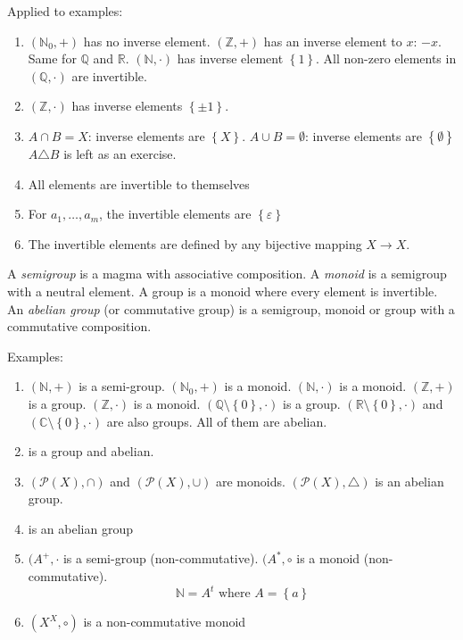 \documentclass[a4paper,landscape,twocolumn]{article}
\newcommand\set[1]{\left\{#1\right\}}
\begin{document}
Applied to examples:
\begin{enumerate}
  \item
    $(\mathbb{N}_0, +)$ has no inverse element.
    $(\mathbb{Z}, +)$ has an inverse element to $x$: $-x$.
    Same for $\mathbb{Q}$ and $\mathbb{R}$.
    $(\mathbb{N}, \cdot)$ has inverse element $\set{1}$.
    All non-zero elements in $(\mathbb{Q}, \cdot)$ are invertible.

  \item
    $(\mathbb{Z}, \cdot)$ has inverse elements $\set{\pm 1}$.

  \item
    $A \cap B = X$: inverse elements are $\set{X}$.
    $A \cup B = \emptyset$: inverse elements are $\set{\emptyset}$
    $A \triangle B$ is left as an exercise.

  \item
    All elements are invertible to themselves

  \item
    For $a_1, \ldots, a_m$, the invertible elements are $\set{\varepsilon}$

  \item
    The invertible elements are defined by any bijective mapping $X \rightarrow X$.
\end{enumerate}

A \emph{semigroup} is a magma with associative composition.
A \emph{monoid} is a semigroup with a neutral element.
A group is a monoid where every element is invertible.
An \emph{abelian group} (or commutative group) is a semigroup, monoid or group with a commutative composition.


Examples:
\begin{enumerate}
  \item $(\mathbb{N}, +)$ is a semi-group.
        $(\mathbb{N}_0, +)$ is a monoid.
        $(\mathbb{N}, \cdot)$ is a monoid.
        $(\mathbb{Z}, +)$ is a group.
        $(\mathbb{Z}, \cdot)$ is a monoid.
        $(\mathbb{Q} \setminus \set{0}, \cdot)$ is a group.
        $(\mathbb{R} \setminus \set{0}, \cdot)$ and $(\mathbb{C} \setminus \set{0}, \cdot)$ are also groups.
        All of them are abelian.
  \item is a group and abelian.
  \item $(\mathcal{P}(X), \cap)$ and $(\mathcal{P}(X), \cup)$ are monoids. $(\mathcal{P}(X), \triangle)$ is an abelian group.
  \item is an abelian group
  \item $(A^+, \cdot$ is a semi-group (non-commutative). $(A^*, \circ$ is a monoid (non-commutative).
        \[ \mathbb{N} = A^t \text{ where } A = \set{a} \]
  \item $(X^X, \circ)$ is a non-commutative monoid
\end{enumerate}
\end{document}

